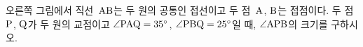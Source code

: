 \noindent\begin{minipage}[t]{0.58\linewidth}\vspace{0pt}\raggedright 오른쪽 그림에서 직선~$\mathrm{AB}$는 두 원의 공통인 접선이고 두 점~$\mathrm{A}$, $\mathrm{B}$는 접점이다. 두 점~$\mathrm{P}$, $\mathrm{Q}$가 두 원의 교점이고 $\angle\mathrm{PAQ}=35^\circ$, $\angle\mathrm{PBQ}=25^\circ$일 때, $\angle\mathrm{APB}$의 크기를 구하시오.\end{minipage}\hfill\begin{minipage}[t]{0.4\linewidth}\vspace{0pt}\centering \resizebox{\ifdim\width>\linewidth\linewidth\else\width\fi}{!}{}\end{minipage}\par
